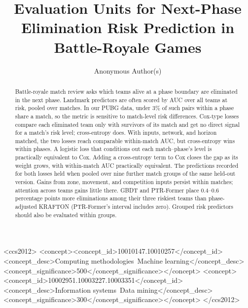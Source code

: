\documentclass[sigconf,anonymous]{acmart}
\begin{document}
\title{Evaluation Units for Next-Phase Elimination Risk Prediction in Battle-Royale Games}
\renewcommand{\shorttitle}{Evaluation Units for Next-Phase Elimination Prediction}

\author{Anonymous Author(s)}

\begin{abstract}
Battle-royale match review asks which teams alive at a phase boundary are eliminated in the next phase. Landmark predictors are often scored by AUC over all teams at risk, pooled over matches. In our PUBG data, under 3\% of such pairs within a phase share a match, so the metric is sensitive to match-level risk differences. Cox-type losses compare each eliminated team only with survivors of its match and get no direct signal for a match's risk level; cross-entropy does. With inputs, network, and horizon matched, the two losses reach comparable within-match AUC, but cross-entropy wins within phases. A logistic loss that conditions out each match--phase's level is practically equivalent to Cox. Adding a cross-entropy term to Cox closes the gap as its weight grows, with within-match AUC practically equivalent. The predictions recorded for both losses held when pooled over nine further match groups of the same held-out version. Gains from zone, movement, and competition inputs persist within matches; attention across teams gains little there. GBDT and PTR-Former place 0.4--0.6 percentage points more eliminations among their three riskiest teams than phase-adjusted KRAFTON (PTR-Former's interval includes zero). Grouped risk predictors should also be evaluated within groups.
\end{abstract}
\begin{CCSXML}
<ccs2012>
<concept><concept_id>10010147.10010257</concept_id><concept_desc>Computing methodologies~Machine learning</concept_desc><concept_significance>500</concept_significance></concept>
<concept><concept_id>10002951.10003227.10003351</concept_id><concept_desc>Information systems~Data mining</concept_desc><concept_significance>300</concept_significance></concept>
</ccs2012>
\end{CCSXML}
\maketitle
\end{document}
